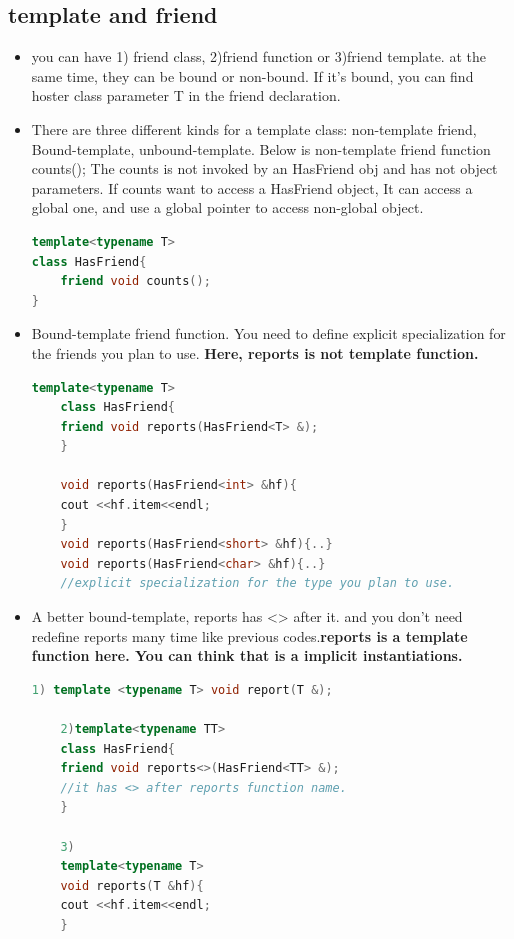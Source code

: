 \documentclass[a4paper,12pt,twoside]{book}
\begin{document}
\subsection{template and friend}
\begin{itemize}
	\item you can have 1) friend class, 2)friend function or 3)friend template. at the same time, they can be bound or non-bound. If it's bound, you can find hoster class parameter T in the friend declaration. 
	
	\item  There are three different kinds for a template class: non-template friend,  Bound-template, unbound-template. Below is non-template friend function counts(); The counts is not invoked by an HasFriend obj and has not object parameters.  If counts want to access a HasFriend object, It can access a global one, and use a global pointer to access non-global object.
\begin{lstlisting}[frame=single, language=c++]
template<typename T>
class HasFriend{
	friend void counts();
}
\end{lstlisting}
	
	\item Bound-template friend function. You need to define explicit specialization for the friends you plan to use. \textbf{Here, reports is not template function. }
	
	\begin{lstlisting}[frame=single, language=c++]
	template<typename T>
	class HasFriend{
	friend void reports(HasFriend<T> &);
	}
	
	void reports(HasFriend<int> &hf){
	cout <<hf.item<<endl;
	}
	void reports(HasFriend<short> &hf){..}
	void reports(HasFriend<char> &hf){..}
	//explicit specialization for the type you plan to use.
	\end{lstlisting}
	
	\item A better bound-template, reports has <> after it.  and you don't need redefine reports many time like previous codes.\textbf{reports is a template function here. You can think that is a implicit instantiations. }
	\begin{lstlisting}[frame=single, language=c++]
	1) template <typename T> void report(T &);
	
	2)template<typename TT>
	class HasFriend{
	friend void reports<>(HasFriend<TT> &);
	//it has <> after reports function name.
	}
	
	3)
	template<typename T>
	void reports(T &hf){
	cout <<hf.item<<endl;
	}
	\end{lstlisting}
	

\end{itemize}
\end{document}
